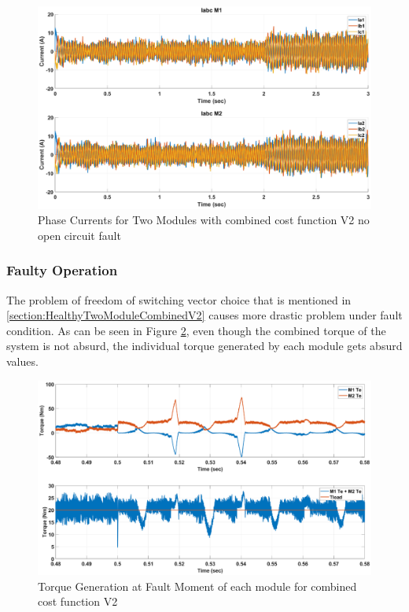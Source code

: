 \documentclass{article}
\begin{document}
\begin{figure}[H]
\centering
\includegraphics[scale=0.3]{Figures/TwoModule/CombinedCostV2/Ia_Ib_Ic.eps}
\caption{Phase Currents for Two Modules with combined cost function V2 no open circuit fault}
\label{fig:Current_abc_TwoModuleCombinedCostV2}
\end{figure}

\subsubsection{Faulty Operation}
\label{section:FaultyTwoModuleCombinedV2}
The problem of freedom of switching vector choice that is mentioned in \ref{section:HealthyTwoModuleCombinedV2} causes more drastic problem under fault condition. As can be seen in Figure \ref{fig:FaultMomentCombinedCostV2}, even though the combined torque of the system is not absurd, the individual torque generated by each module gets absurd values. 

\begin{figure}[H]
\centering
\includegraphics[scale=0.3]{Figures/TwoModule/CombinedCostV2/FaultMoment.eps}
\caption{Torque Generation at Fault Moment of each module for combined cost function V2}
\label{fig:FaultMomentCombinedCostV2}
\end{figure}
\end{document}
